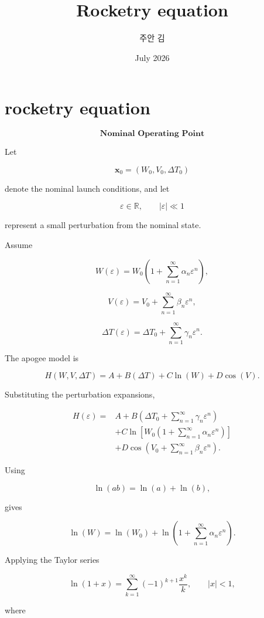 \documentclass{article}
\title{Rocketry equation}
\author{주안 김}
\date{July 2026}
\begin{document}
\maketitle

\section{rocketry equation}


\[
\textbf{Nominal Operating Point}
\]

Let

\[
\mathbf{x}_0=(W_0,V_0,\Delta T_0)
\]

denote the nominal launch conditions, and let

\[
\varepsilon\in\mathbb{R},
\qquad
|\varepsilon|\ll1
\]

represent a small perturbation from the nominal state.

Assume

\[
W(\varepsilon)
=
W_0
\left(
1+\sum_{n=1}^{\infty}\alpha_n\varepsilon^n
\right),
\]

\[
V(\varepsilon)
=
V_0
+
\sum_{n=1}^{\infty}\beta_n\varepsilon^n,
\]

\[
\Delta T(\varepsilon)
=
\Delta T_0
+
\sum_{n=1}^{\infty}\gamma_n\varepsilon^n.
\]

The apogee model is

\[
H(W,V,\Delta T)
=
A
+
B(\Delta T)
+
C\ln(W)
+
D\cos(V).
\]

Substituting the perturbation expansions,

\[
\begin{aligned}
H(\varepsilon)
=
&
A
+
B
\left(
\Delta T_0
+
\sum_{n=1}^{\infty}
\gamma_n\varepsilon^n
\right)
\\
&
+
C
\ln
\left[
W_0
\left(
1+\sum_{n=1}^{\infty}
\alpha_n\varepsilon^n
\right)
\right]
\\
&
+
D
\cos
\left(
V_0
+
\sum_{n=1}^{\infty}
\beta_n\varepsilon^n
\right).
\end{aligned}
\]

Using

\[
\ln(ab)=\ln(a)+\ln(b),
\]

gives

\[
\ln(W)
=
\ln(W_0)
+
\ln
\left(
1+\sum_{n=1}^{\infty}
\alpha_n\varepsilon^n
\right).
\]

Applying the Taylor series

\[
\ln(1+x)
=
\sum_{k=1}^{\infty}
(-1)^{k+1}
\frac{x^k}{k},
\qquad
|x|<1,
\]

where
\end{document}
